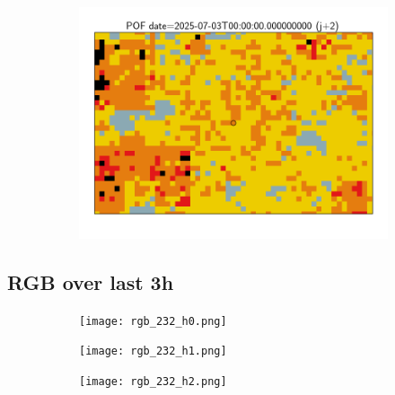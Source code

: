 \documentclass{article}
\begin{document}
\begin{figure}[H]
\begin{subfigure}[b]{0.31\textwidth}
    \end{subfigure}
    \begin{subfigure}[b]{0.36\textwidth}
        \centering
        \includegraphics[width=0.85\linewidth]{pof_232_j2.png} %
    \end{subfigure}
\end{figure}


\vspace{-1em}
\subsection*{RGB over last 3h}
\vspace{-1em}
\begin{figure}[H]
    \centering
    \begin{subfigure}[b]{0.32\textwidth}
        \centering
        \texttt{[image: rgb\_232\_h0.png]} %
    \end{subfigure}
    \begin{subfigure}[b]{0.32\textwidth}
        \centering
        \texttt{[image: rgb\_232\_h1.png]} %
    \end{subfigure}
    \begin{subfigure}[b]{0.32\textwidth}
        \centering
        \texttt{[image: rgb\_232\_h2.png]} %
    \end{subfigure}
\end{figure}
\end{document}
